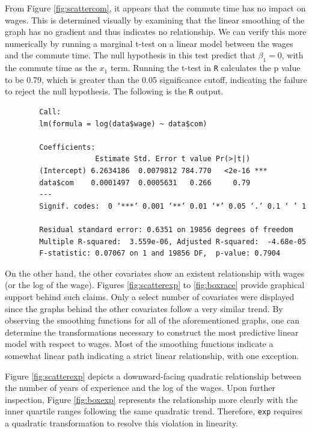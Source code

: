 \documentclass{article}
\begin{document}
      From Figure \ref{fig:scattercom}, it appears that the commute time has no impact
      on wages. This is determined visually by examining that the linear smoothing of the graph
      has no gradient and thus indicates no relationship. We can verify this more numerically
      by running a marginal t-test on a linear model between the wages and the commute time.
      The null hypothesis in this test predict that $\beta_1 = 0$, with the commute time
      as the $x_1$ term. Running the t-test in \texttt{R} calculates the p value to be 0.79,
      which is greater than the 0.05 significance cutoff, indicating the failure to reject
      the null hypothesis. The following is the \texttt{R} output.

      \begin{verbatim}
        Call:
        lm(formula = log(data$wage) ~ data$com)

        Coefficients:
                     Estimate Std. Error t value Pr(>|t|)
        (Intercept) 6.2634186  0.0079812 784.770   <2e-16 ***
        data$com    0.0001497  0.0005631   0.266     0.79
        ---
        Signif. codes:  0 ‘***’ 0.001 ‘**’ 0.01 ‘*’ 0.05 ‘.’ 0.1 ‘ ’ 1

        Residual standard error: 0.6351 on 19856 degrees of freedom
        Multiple R-squared:  3.559e-06,	Adjusted R-squared:  -4.68e-05
        F-statistic: 0.07067 on 1 and 19856 DF,  p-value: 0.7904
      \end{verbatim}

      On the other hand, the other covariates show an existent relationship with wages
      (or the log of the wage). Figures \ref{fig:scatterexp} to \ref{fig:boxrace} provide
      graphical support behind such claims. Only a select number of covariates were displayed
      since the graphs behind the other covariates follow a very similar trend. By
      observing the smoothing functions for all of the aforementioned graphs,
      one can determine the transformations necessary to construct the
      most predictive linear model with respect to wages. Most of the smoothing
      functions indicate a somewhat linear path indicating a strict linear relationship,
      with one exception.

      Figure \ref{fig:scatterexp} depicts a downward-facing
      quadratic relationship between the number of years of experience and the log
      of the wages. Upon further inspection, Figure \ref{fig:boxexp} represents
      the relationship more clearly with the inner quartile ranges following the
      same quadratic trend. Therefore, \texttt{exp} requires a quadratic transformation
      to resolve this violation in linearity. \\
\end{document}
